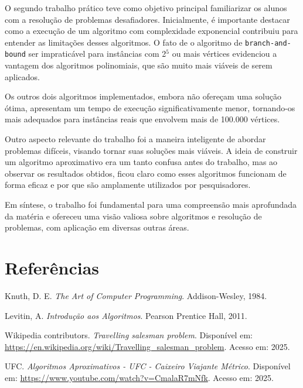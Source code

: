 \documentclass[12pt]{article}
\begin{document}
O segundo trabalho prático teve como objetivo principal familiarizar os alunos com a resolução de problemas desafiadores. Inicialmente, é importante destacar como a execução de um algoritmo com complexidade exponencial contribuiu para entender as limitações desses algoritmos. O fato de o algoritmo de \texttt{branch-and-bound} ser impraticável para instâncias com 2$^{5}$ ou mais vértices evidenciou a vantagem dos algoritmos polinomiais, que são muito mais viáveis de serem aplicados.

Os outros dois algoritmos implementados, embora não ofereçam uma solução ótima, apresentam um tempo de execução significativamente menor, tornando-os mais adequados para instâncias reais que envolvem mais de 100.000 vértices.

Outro aspecto relevante do trabalho foi a maneira inteligente de abordar problemas difíceis, visando tornar suas soluções mais viáveis. A ideia de construir um algoritmo aproximativo era um tanto confusa antes do trabalho, mas ao observar os resultados obtidos, ficou claro como esses algoritmos funcionam de forma eficaz e por que são amplamente utilizados por pesquisadores.

Em síntese, o trabalho foi fundamental para uma compreensão mais aprofundada da matéria e ofereceu uma visão valiosa sobre algoritmos e resolução de problemas, com aplicação em diversas outras áreas.

\section{Referências}

\begin{thebibliography}{99}

 Knuth, D. E. \textit{The Art of Computer Programming}. Addison-Wesley, 1984.

 Levitin, A. \textit{Introdução aos Algoritmos}. Pearson Prentice Hall, 2011.

 Wikipedia contributors. \textit{Travelling salesman problem}. Disponível em: \url{https://en.wikipedia.org/wiki/Travelling_salesman_problem}. Acesso em: 2025.

 UFC. \textit{Algoritmos Aproximativos - UFC - Caixeiro Viajante Métrico}. Disponível em: \url{https://www.youtube.com/watch?v=CmalaR7mNfk}. Acesso em: 2025.

\end{thebibliography}
\end{document}
